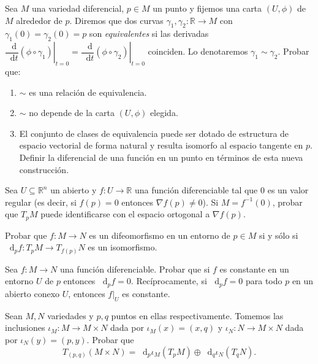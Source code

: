 \documentclass[12pt, a4paper]{amsart}
\theoremstyle{definition}
\newcommand{\RR}{\mathbb{R}}      %
\newcommand*\diff{\mathop{}\!\mathrm{d}}
\begin{document}
\begin{question}
Sea $M$ una variedad diferencial, $p\in M$ un punto y fijemos una carta $(U,\phi)$ de $M$ alrededor de $p$. Diremos que dos curvas $\gamma_1,\gamma_2:\RR\to M$ con $\gamma_1(0)=\gamma_2(0)=p$ son \textit{equivalentes} si las derivadas $\left.\dfrac{\diff}{\diff t}(\phi\circ\gamma_1)\right|_{t=0}=\left.\dfrac{\diff}{\diff t}(\phi\circ\gamma_2)\right|_{t=0}$ coinciden. Lo denotaremos $\gamma_1\sim\gamma_2$. Probar que:
\begin{enumerate}[label=\textbf{\alph*.}]
\item $\sim$ es una relación de equivalencia.
\item $\sim$ no depende de la carta $(U,\phi)$ elegida.
\item El conjunto de clases de equivalencia puede ser dotado de estructura de espacio vectorial de forma natural y resulta isomorfo al espacio tangente en $p$. Definir la diferencial de una función en un punto en términos de esta nueva construcción.
\end{enumerate}
\end{question}

\begin{question}
Sea $U\subseteq\RR^n$ un abierto y $f:U\to\RR$ una función diferenciable tal que $0$ es un valor regular (es decir, si $f(p)=0$ entonces $\nabla f(p)\neq 0$). Si $M=f^{-1}(0)$, probar que $T_pM$ puede identificarse con el espacio ortogonal a $\nabla f(p)$.
\end{question}

\begin{question}
Probar que $f:M\to N$ es un difeomorfismo en un entorno de $p\in M$ si y sólo si $\diff_p f:T_pM\to T_{f(p)}N$ es un isomorfismo. 
\end{question}

\begin{question}
Sea $f:M\to N$ una función diferenciable. Probar que si $f$ es constante en un entorno $U$ de $p$ entonces $\diff_pf=0$. Recíprocamente, si $\diff_p f=0$ para todo $p$ en un abierto conexo $U$, entonces $\left.f\right|_U$ es constante.
\end{question}

\begin{question}
Sean $M,N$ variedades y $p,q$ puntos en ellas respectivamente. Tomemos las inclusiones $\iota_M:M\to M\times N$ dada por $\iota_M(x)=(x,q)$ y $\iota_N:N\to M\times N$ dada por $\iota_N(y)=(p,y)$. Probar que $$T_{(p,q)}(M\times N) = \diff_p\iota_M(T_pM)\oplus\diff_q\iota_N(T_qN).$$
\end{question}
\end{document}
